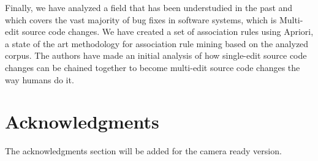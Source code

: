 \documentclass[conference]{IEEEtran}
\begin{document}
Finally, we have analyzed a field that has been understudied in the past and which covers 
the vast majority of bug fixes in software systems, which is Multi-edit source code changes. 
We have created a set of association rules using Apriori, a state of the art
methodology for association rule mining based on the analyzed corpus. The authors have
made an initial analysis of how single-edit source code changes can be chained together 
to become multi-edit source code changes the way humans do it.





\section*{Acknowledgments}
The acknowledgments section will be added for the camera ready version. 







%
%
%







\end{document}
